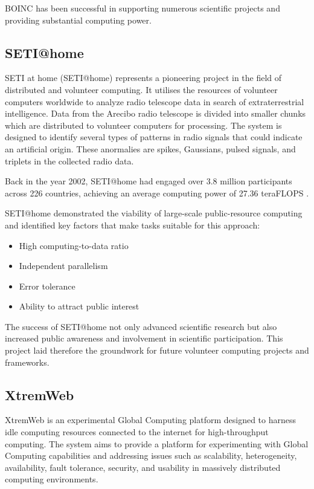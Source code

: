 BOINC has been successful in supporting numerous scientific projects and providing substantial computing power. \cite{relatedwork:boinc1}

\subsection{SETI@home}
\label{subsec:background:related_work:seti}
\ac{SETI} at home (\ac{SETI}@home) represents a pioneering project in the field of distributed and volunteer computing. It utilises the resources of volunteer computers worldwide to analyze radio telescope data in search of extraterrestrial intelligence. Data from the Arecibo radio telescope is divided into smaller chunks which are distributed to volunteer computers for processing. The system is designed to identify several types of patterns in radio signals that could indicate an artificial origin. These anormalies are spikes, Gaussians, pulsed signals, and triplets in the collected radio data. \cite{relatedwork:seti}

Back in the year 2002, \ac{SETI}@home had engaged over 3.8 million participants across 226 countries, achieving an average computing power of 27.36 teraFLOPS \cite{relatedwork:seti}.

\ac{SETI}@home demonstrated the viability of large-scale public-resource computing and identified key factors that make tasks suitable for this approach:
\begin{itemize}
  \item High computing-to-data ratio
  \item Independent parallelism
  \item Error tolerance
  \item Ability to attract public interest
\end{itemize}
The success of \ac{SETI}@home not only advanced scientific research but also increased public awareness and involvement in scientific participation. This project laid therefore the groundwork for future volunteer computing projects and frameworks. \cite{relatedwork:seti}

\subsection{XtremWeb}
\label{subsec:background:related_work:xtremweb}
XtremWeb is an experimental Global Computing platform designed to harness idle computing resources connected to the internet for high-throughput computing. The system aims to provide a platform for experimenting with Global Computing capabilities and addressing issues such as scalability, heterogeneity, availability, fault tolerance, security, and usability in massively distributed computing environments. \cite{relatedwork:xtremweb}

